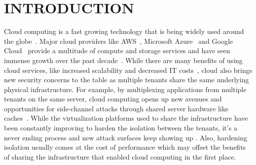 \section{INTRODUCTION}
\label{sec:intro}



Cloud computing is a fast growing technology that is being widely used 
around the globe~. Major cloud providers like AWS~\cite{awscloud}, 
Microsoft Azure~\cite{azurecloud} and Google Cloud~\cite{googlecloud} 
provide a multitude of compute and storage services and have seen 
immense growth over the past decade~. While there are many 
benefits of using cloud services, like increased scalability and 
decreased IT costs~\cite{Armbrust}, cloud also brings new security 
concerns to the table as multiple tenants share the same underlying 
physical infrastructure. 
For example, by multiplexing applications from multiple tenants on 
the same server, cloud computing opens up new avenues and opportunities 
for side-channel attacks through shared server hardware like 
caches~\cite{meltdown, xuccsw2011}. While the virtualization platforms 
used to share the infrastructure have been constantly improving to harden 
the isolation between the tenants, it's a never ending process and new 
attack surfaces keep showing up . Also, hardening isolation 
usually comes 
at the cost of performance which may offset the benefits of sharing 
the infrastructure that enabled cloud computing in the first place.


